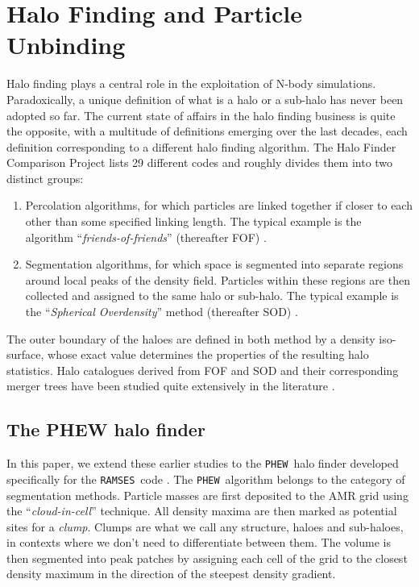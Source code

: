 \documentclass[a4paper,twocolumn,fleqn,usenatbib]{mnras}
\newcommand{\ramses}{\texttt{RAMSES}}
\newcommand{\phew}{\texttt{PHEW}}
\begin{document}
\section{Halo Finding and Particle Unbinding}\label{chap:phew}

Halo finding plays a central role in the exploitation of N-body
simulations. Paradoxically, a unique definition of what is a halo or a
sub-halo has never been adopted so far.  The current state of affairs
in the halo finding business is quite the opposite, with a multitude
of definitions emerging over the last decades, each definition
corresponding to a different halo finding algorithm.  The Halo Finder
Comparison Project \citep{MAD} lists 29 different codes and roughly
divides them into two distinct groups:
\begin{enumerate}
\item Percolation algorithms, for which particles are linked together
  if closer to each other than some specified linking length. The
  typical example is the algorithm ``\emph{friends-of-friends}''
  (thereafter FOF) \citep{FOF}.
\item Segmentation algorithms, for which space is segmented into
  separate regions around local peaks of the density field. Particles
  within these regions are then collected and assigned to the same
  halo or sub-halo. The typical example is the ``\emph{Spherical
  Overdensity}'' method (thereafter SOD) \citep{SO}.
\end{enumerate}
The outer boundary of the haloes are defined in both method by a
density iso-surface, whose exact value determines the properties of
the resulting halo statistics.  Halo catalogues derived from FOF and
SOD and their corresponding merger trees have been studied quite
extensively in the literature \citep[see e.g.][]{SUSSING_HALOFINDER}.

\subsection{The PHEW halo finder}

In this paper, we extend these earlier studies to the \phew\ halo
finder \citep{PHEW} developed specifically for the \ramses\ code
\citep{ramses}.  The \phew\ algorithm belongs to the category of
segmentation methods.  Particle masses are first deposited to the AMR
grid using the ``\emph{cloud-in-cell}'' technique. All density maxima
are then marked as potential sites for a \emph{clump}. Clumps are what
we call any structure, haloes and sub-haloes, in contexts where we
don't need to differentiate between them. The volume is then segmented
into peak patches by assigning each cell of the grid to the closest
density maximum in the direction of the steepest density gradient.
\end{document}
